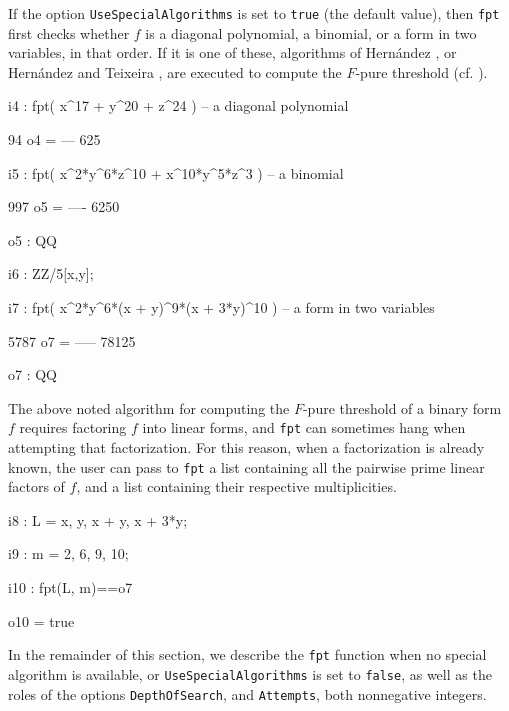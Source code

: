 \documentclass{amsart}
\begin{document}
If the option {\tt UseSpecialAlgorithms} is set to {\tt true} (the default value), then {\tt fpt} first checks whether $f$ is a diagonal polynomial, a binomial, or a form in two variables, in that order.
If it is one of these, algorithms of Hern\'andez \cite{HernandezFInvariantsOfDiagonalHyp, HernandezFPureThresholdOfBinomial}, or Hern\'andez and Teixeira \cite{HernandezTeixeiraFThresholdFunctions},  are executed to compute the $F$-pure threshold (cf. \cite{ShibutaTakagiLCThresholds}).

{\small
{}
\begin{MyVerbatim}

i4 : fpt( x^17 + y^20 + z^24 ) -- a diagonal polynomial

      94
o4 = ---
     625
     
i5 : fpt( x^2*y^6*z^10 + x^10*y^5*z^3 ) -- a binomial

      997
o5 = ----
     6250

o5 : QQ     

i6 : ZZ/5[x,y];

i7 : fpt( x^2*y^6*(x + y)^9*(x + 3*y)^10 ) -- a form in two variables

      5787
o7 = -----
     78125

o7 : QQ

\end{MyVerbatim}
}
       
The above noted algorithm for computing the $F$-pure threshold of a binary form $f$ requires factoring $f$ into linear forms, and {\tt fpt} can sometimes hang when attempting that factorization. For this reason, when a factorization is already known, the user can pass to {\tt fpt} a list containing all the pairwise prime linear factors of $f$, and a list containing their respective multiplicities.

{\small
{}
\begin{MyVerbatim}

i8 : L = {x, y, x + y, x + 3*y};

i9 : m = {2, 6, 9, 10};

i10 : fpt(L, m)==o7

o10 = true

\end{MyVerbatim}
}

In the remainder of this section, we describe the {\tt fpt} function when no special algorithm is available, or {\tt UseSpecialAlgorithms} is set to {\tt false},  as well as the roles of the options {\tt DepthOfSearch}, and {\tt Attempts}, both nonnegative integers.  
\end{document}
